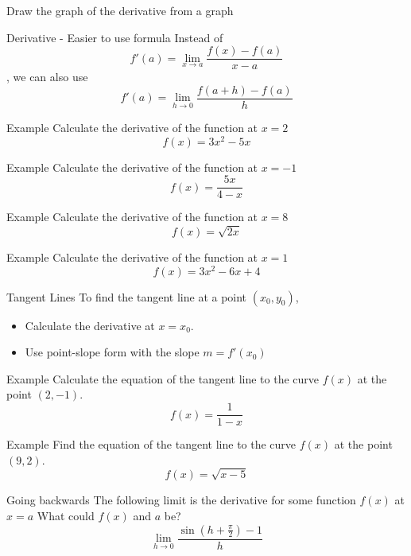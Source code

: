 \documentclass[t]{beamer}
\begin{document}
\begin{frame}{Draw the graph of the derivative from a graph}
\end{frame}

\begin{frame}{Derivative - Easier to use formula}
Instead of 
$$f'(a) = \lim_{x \to a} \frac{f(x) - f(a)}{x-a}$$,
we can also use
$$f'(a) = \lim_{h \to 0} \frac{f(a+h) - f(a)}{h}$$
\end{frame}

\begin{frame}{Example}
Calculate the derivative of the function at $x = 2$
$$f(x) = 3x^2 -5x$$
\end{frame}

\begin{frame}{Example}
Calculate the derivative of the function at $x = -1$
$$f(x) = \frac{5x}{4-x}$$
\end{frame}

\begin{frame}{Example}
Calculate the derivative of the function at $x = 8$
$$f(x) = \sqrt{2x}$$
\end{frame}

\begin{frame}{Example}
Calculate the derivative of the function at $x = 1$
$$f(x) = 3x^2 - 6x +4 $$
\end{frame}

\begin{frame}{Tangent Lines}
To find the tangent line at a point $(x_0, y_0)$,
\begin{itemize}
\item Calculate the derivative at $x = x_0$.  
\item Use point-slope form with the slope $m = f'(x_0)$
\end{itemize}
\end{frame}

\begin{frame}{Example}
Calculate the equation of the tangent line to the curve $f(x)$ at
the point $(2, -1)$.
$$f(x) = \frac{1}{1-x}$$
\end{frame}

\begin{frame}{Example}
Find the equation of the tangent line to the curve $f(x)$ at the
point $(9,2)$.
$$f(x) = \sqrt{x - 5}$$
\end{frame}

\begin{frame}{Going backwards}
The following limit is the derivative for some function $f(x)$ at $x=a$
What could $f(x)$ and $a$ be?
$$\lim_{h \to 0} \frac{\sin\left( h + \frac{\pi}{2}\right) -1}{h}$$
\end{frame}
\end{document}
